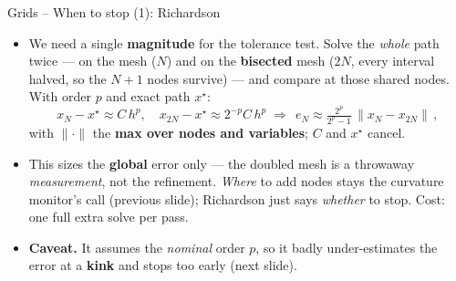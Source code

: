 \documentclass[11pt,aspectratio=169]{beamer}
\begin{document}
\begin{frame}{Grids -- When to stop (1): Richardson}

\begin{itemize}

\item We need a single \textbf{magnitude} for the tolerance test. Solve the
  \emph{whole} path twice — on the mesh ($N$) and on the \textbf{bisected}
  mesh ($2N$, every interval halved, so the $N{+}1$ nodes survive) — and
  compare at those shared nodes. With order $p$ and exact path $x^\star$:
  {\small\[
  x_N - x^\star \approx C\,h^p,\quad
  x_{2N} - x^\star \approx 2^{-p}C\,h^p
  \;\Longrightarrow\;
  \boxed{\,e_N \approx \tfrac{2^p}{2^p-1}\,\|x_N - x_{2N}\|\,},
  \]}
  with $\|\cdot\|$ the \textbf{max over nodes and variables}; $C$ and
  $x^\star$ cancel.\newline

\item This sizes the \textbf{global} error only — the doubled mesh is a
  throwaway \emph{measurement}, not the refinement. \emph{Where} to add nodes
  stays the curvature monitor's call (previous slide); Richardson just says
  \emph{whether} to stop. Cost: one full extra solve per pass.\newline

\item \textbf{Caveat.} It assumes the \emph{nominal} order $p$, so it badly
  under-estimates the error at a \textbf{kink} and stops too early (next slide).

\end{itemize}

\end{frame}
\end{document}
